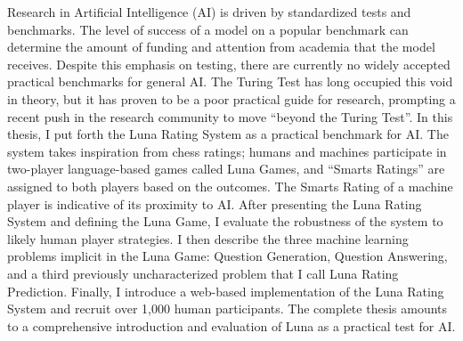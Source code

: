
Research in Artificial Intelligence (AI) is driven by standardized tests and benchmarks. The level of success of a model on a popular benchmark can determine the amount of funding and attention from academia that the model receives. Despite this emphasis on testing, there are currently no widely accepted practical benchmarks for general AI. The Turing Test has long occupied this void in theory, but it has proven to be a poor practical guide for research, prompting a recent push in the research community to move ``beyond the Turing Test''. In this thesis, I put forth the Luna Rating System as a practical benchmark for AI. The system takes inspiration from chess ratings; humans and machines participate in two-player language-based games called Luna Games, and ``Smarts Ratings'' are assigned to both players based on the outcomes. The Smarts Rating of a machine player is indicative of its proximity to AI. After presenting the Luna Rating System and defining the Luna Game, I evaluate the robustness of the system to likely human player strategies. I then describe the three machine learning problems implicit in the Luna Game: Question Generation, Question Answering, and a third previously uncharacterized problem that I call Luna Rating Prediction. Finally, I introduce a web-based implementation of the Luna Rating System and recruit over 1,000 human participants. The complete thesis amounts to a comprehensive introduction and evaluation of Luna as a practical test for AI.